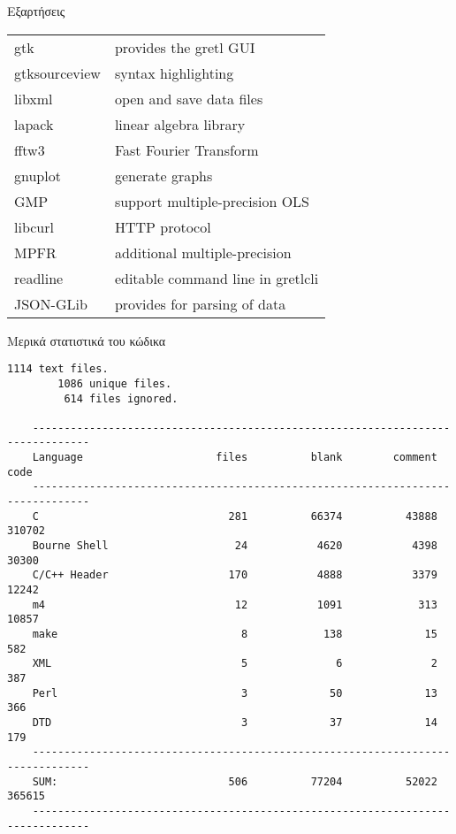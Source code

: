 \documentclass[xetex]{beamer}
\begin{document}
\begin{frame}{Εξαρτήσεις}
    \begin{tabular}{| l | l |}
    \hline
    gtk & provides the gretl GUI\\
    gtksourceview & syntax highlighting\\
    libxml & open and save data files\\
    lapack & linear algebra library\\
    fftw3 & Fast Fourier Transform\\
    gnuplot & generate graphs\\
    GMP & support multiple-precision OLS\\
    libcurl & HTTP protocol\\
    MPFR & additional multiple-precision\\
    readline & editable command line in gretlcli\\
    JSON-GLib & provides for parsing of data\\
    \hline
    \end{tabular}
\end{frame}

\begin{frame}[fragile]{Μερικά στατιστικά του κώδικα}
    \begin{Verbatim}[fontsize=\tiny]
        1114 text files.
        1086 unique files.                                          
         614 files ignored.

    -------------------------------------------------------------------------------
    Language                     files          blank        comment           code
    -------------------------------------------------------------------------------
    C                              281          66374          43888         310702
    Bourne Shell                    24           4620           4398          30300
    C/C++ Header                   170           4888           3379          12242
    m4                              12           1091            313          10857
    make                             8            138             15            582
    XML                              5              6              2            387
    Perl                             3             50             13            366
    DTD                              3             37             14            179
    -------------------------------------------------------------------------------
    SUM:                           506          77204          52022         365615
    -------------------------------------------------------------------------------
    \end{Verbatim}
\end{frame}
\end{document}
